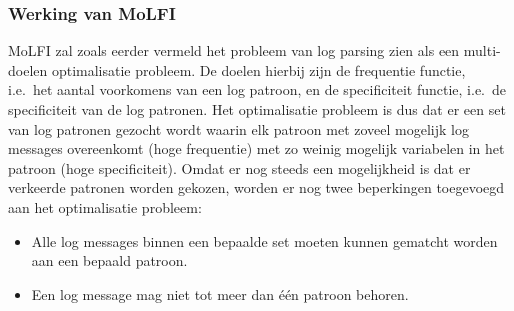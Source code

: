 \subsubsection{Werking van MoLFI}
MoLFI zal zoals eerder vermeld het probleem van log parsing zien als een multi-doelen optimalisatie probleem. De doelen hierbij zijn de frequentie functie, i.e.\ het aantal voorkomens van een log patroon, en de specificiteit functie, i.e.\ de specificiteit van de log patronen. Het optimalisatie probleem is dus dat er een set van log patronen gezocht wordt waarin elk patroon met zoveel mogelijk log messages overeenkomt (hoge frequentie) met zo weinig mogelijk variabelen in het patroon (hoge specificiteit). Omdat er nog steeds een mogelijkheid is dat er verkeerde patronen worden gekozen, worden er nog twee beperkingen toegevoegd aan het optimalisatie probleem:
\begin{itemize}
    \item Alle log messages binnen een bepaalde set moeten kunnen gematcht worden aan een bepaald patroon.
    \item Een log message mag niet tot meer dan één patroon behoren.
\end{itemize}


